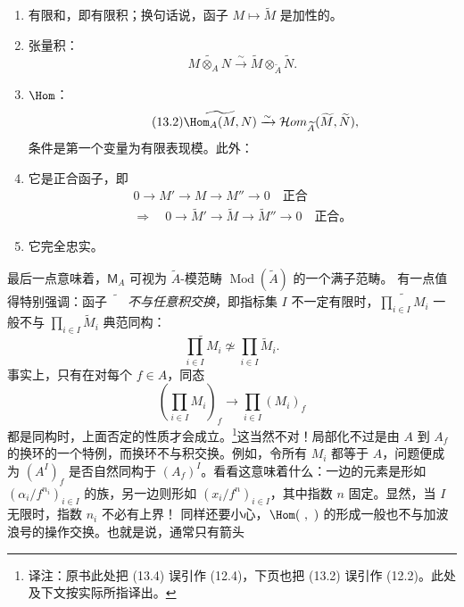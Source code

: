\begin{enumerate}[label=\arabic*)]
\item 有限和，即有限积；换句话说，函子 $M\mapsto\widetilde M$ 是加性的。
\item 张量积：
\begin{equation}\tag{13.1}
 \widetilde{M\otimes_A N}\xrightarrow{\sim}
 \widetilde M\otimes_{\widetilde A}\widetilde N.
\end{equation}
\item $\Hom$：
\begin{equation}\tag{13.2}
 \widetilde{\Hom_A(M,N)}\xrightarrow{\sim}
 \mathcal{H}om_{\widetilde A}(\widetilde M,\widetilde N),
\end{equation}
条件是第一个变量为有限表现模。此外：
\item 它是正合函子，即
\begin{equation}\tag{13.3}
\begin{gathered}
0\longrightarrow M'\longrightarrow M\longrightarrow M''\longrightarrow0
\quad\text{正合}\\
\Longrightarrow\quad
0\longrightarrow\widetilde M'\longrightarrow\widetilde M
\longrightarrow\widetilde M''\longrightarrow0
\quad\text{正合。}
\end{gathered}
\end{equation}
\item 它完全忠实。
\end{enumerate}
最后一点意味着，$\mathsf M_A$ 可视为 $\widetilde A$-模范畴 $\operatorname{Mod}(\widetilde A)$ 的一个满子范畴。
有一点值得特别强调：函子 $\widetilde{\phantom M}$ \emph{不与任意积交换}，即指标集 $I$ 不一定有限时，$\widetilde{\prod_{i\in I}M_i}$ 一般不与 $\prod_{i\in I}\widetilde M_i$ 典范同构：
\begin{equation}\tag{13.4}
 \widetilde{\prod_{i\in I}M_i}\not\simeq
 \prod_{i\in I}\widetilde M_i.
\end{equation}
事实上，只有在对每个 $f\in A$，同态
\[
 \left(\prod_{i\in I}M_i\right)_f\longrightarrow
 \prod_{i\in I}(M_i)_f
\]
都是同构时，上面否定的性质才会成立。\footnote{译注：原书此处把 (13.4) 误引作 (12.4)，下页也把 (13.2) 误引作 (12.2)。此处及下文按实际所指译出。}这当然不对！局部化不过是由 $A$ 到 $A_f$ 的换环的一个特例，而换环不与积交换。例如，令所有 $M_i$ 都等于 $A$，问题便成为 $(A^I)_f$ 是否自然同构于 $(A_f)^I$。看看这意味着什么：一边的元素是形如 $(\alpha_i/f^{n_i})_{i\in I}$ 的族，另一边则形如 $(x_i/f^n)_{i\in I}$，其中指数 $n$ 固定。显然，当 $I$ 无限时，指数 $n_i$
不必有上界！
同样还要小心，$\Hom(\ ,\ )$ 的形成一般也不与加波浪号的操作交换。也就是说，通常只有箭头
